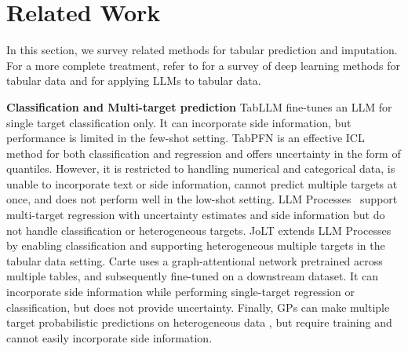 \section{Related Work}
%
In this section, we survey related methods for tabular prediction and imputation.
%
For a more complete treatment, refer to \citet{borisov2022deep} for a survey of deep learning methods for tabular data and \citet{fang2024large,lu2024large} for applying LLMs to tabular data.

\textbf{Classification and Multi-target prediction}
%
TabLLM \citep{hegselmann2023tabllm} fine-tunes an LLM for single target classification only.
%
It can incorporate side information, but performance is limited in the few-shot setting.
%
TabPFN \citep{hollmann2025tabpfn} is an effective ICL method for both classification and regression and offers uncertainty in the form of quantiles.
%
However, it is restricted to handling numerical and categorical data, is unable to incorporate text or side information, cannot predict multiple targets at once, and does not perform well in the low-shot setting.
%
LLM Processes~\citep{requeima2024llm} support multi-target regression with uncertainty estimates and side information but do not handle classification or heterogeneous targets.
%
JoLT extends LLM Processes by enabling classification and supporting heterogeneous multiple targets in the tabular data setting.
%
Carte \citep{kim2024carte} uses a graph-attentional network pretrained across multiple tables, and subsequently fine-tuned on a downstream dataset.
%
It can incorporate side information while performing single-target regression or classification, but does not provide uncertainty.
%
Finally, GPs can make multiple target probabilistic predictions on heterogeneous data \citep{moreno2018heterogeneous}, but require training and cannot easily incorporate side information.

